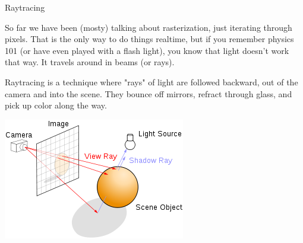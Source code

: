 \documentclass{lug}
\newcommand{\splitslide}[4]{
    \noindent
    \begin{minipage}{#1 \textwidth - #2 }
        #3
    \end{minipage}%
    \hspace{ \dimexpr #2 * 2 \relax }%
    \begin{minipage}{\textwidth - #1 \textwidth - #2 }
        #4
    \end{minipage}
}
\begin{document}
\begin{frame}{Raytracing}
    \splitslide{0.65}{.7em}{
        \small

        So far we have been (mosty) talking about rasterization, just
        iterating through pixels. That is the only way to do things realtime,
        but if you remember physics 101 (or have even played with a flash
        light), you know that light doesn't work that way. It travels around
        in beams (or rays).

        \vspace{1ex}

        Raytracing is a technique where "rays" of light are followed backward,
        out of the camera and into the scene. They bounce off mirrors, refract
        through glass, and pick up color along the way.

    }{
        \includegraphics[width=\textwidth]{graphics/raytracing}
    }
\end{frame}
\end{document}
